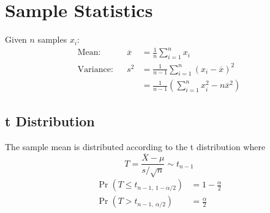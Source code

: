 \documentclass{article}
\begin{document}
\begin{minipage}{62.39259259mm}
    \section*{Sample Statistics}
    Given \(n\) samples \(x_i\):
    \begin{align*}
        \text{Mean:}     &  & \overline{x} & = \frac{1}{n}\sum_{i=1}^{n} x_i                                      \\
        \text{Variance:} &  & s^2          & = \frac{1}{n-1}\sum_{i=1}^{n} \left( x_i - \overline{x} \right)^2    \\
                         &  &              & = \frac{1}{n-1}\left( \sum_{i=1}^{n} x_i^2 - n\overline{x}^2 \right)
    \end{align*}
    \subsection*{t Distribution}
    The sample mean is distributed according to the t distribution where
    \begin{equation*}
        T=\frac{\overline{X} - \mu}{s/\sqrt{n}}\sim t_{n-1}
    \end{equation*}
    \begin{align*}
        \Pr{\left( T \leq t_{n-1,\: 1-\alpha/2} \right)} & = 1 - \frac{\alpha}{2} \\
        \Pr{\left( T > t_{n-1,\: \alpha/2} \right)}      & = \frac{\alpha}{2}
    \end{align*}
\end{minipage}\hfill%
\end{document}
